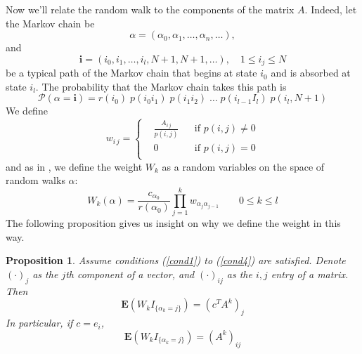\documentclass[a4paper,11pt]{article}
\newtheorem{proposition}[theorem]{Proposition}
\theoremstyle{remark}
\theoremstyle{definition}
\begin{document}
        Now we'll relate the random walk to the components of the matrix $A$.
        Indeed, let the Markov chain be
        \[ \alpha =
            \left( \alpha_0, \alpha_1, \ldots, \alpha_n, \ldots \right),
        \]
        and
        \[ \mathbf{i} =
            \left( i_0, i_1, \ldots , i_l, N+1, N+1, \ldots \right),
            \quad 1\le i_j\le N
        \]
        be a typical path of the Markov chain that begins at state $i_0$ and
        is absorbed at state $i_l$.  The probability that the Markov chain
        takes this path is
        \[ \mathcal{P}(\alpha=\mathbf{i}) =
            r(i_0) \; p(i_0 i_1) \; p(i_1 i_2) \; \ldots \;
            p(i_{l-1} I_l) \; p(i_l,N+1)
        \]
        We define
        \[ w_{i\,j} = \left\{ \begin{aligned}
                & \frac{A_{i\,j}}{p(i,j)} && \mbox{if } p(i,j) \ne 0 \\
                & 0                       && \mbox{if } p(i,j)  =  0 \\
            \end{aligned} \right.
        \]
        and as in \cite{Okten2005}, we define the weight $W_k$ as a random
        variables on the space of random walks $\alpha$:
        \begin{equation} \label{W}
            W_k(\alpha) =
            \frac{c_{\alpha_0}}{r(\alpha_0)}
            \prod_{j=1}^k w_{\alpha_j \alpha_{j-1}} \qquad 0 \le k \le l
        \end{equation}
        The following proposition gives us insight on why we define the weight
        in this way.
        \begin{proposition} \label{prop}
            Assume conditions (\ref{cond1}) to (\ref{cond4}) are satisfied.
            Denote $(\cdot)_j$ as the $j$th component of a vector, and
            $(\cdot)_{i j}$ as the $i,j$ entry of a matrix.  Then
            \begin{equation} \label{approx}
                \mathbf{E}( W_k I_{\{\alpha_k = j\}} ) = \left(c^T A^k\right)_j
            \end{equation}
            In particular, if $c = e_i$,
            \begin{equation} \label{matapprox}
                \mathbf{E}( W_k I_{\{\alpha_k = j\}} ) = \left(A^k\right)_{i j}
            \end{equation}
        \end{proposition}
\end{document}
